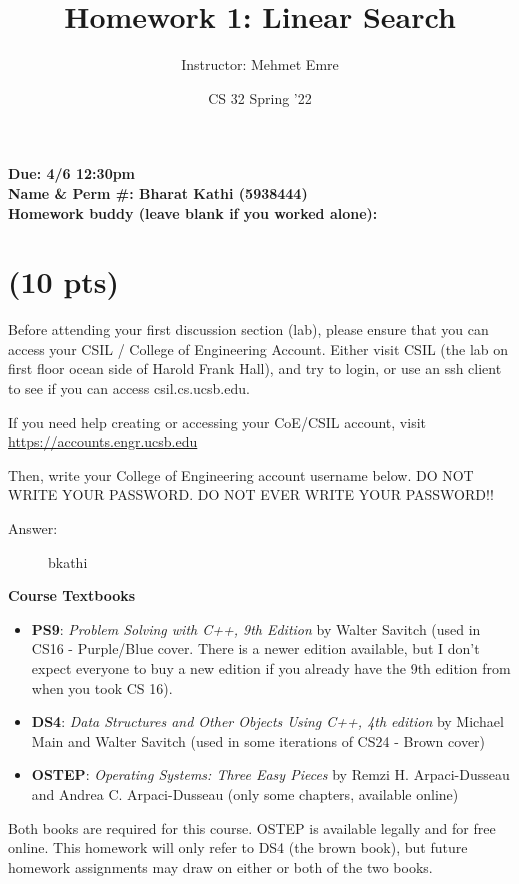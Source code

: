 \documentclass[11pt]{article}
\author{Instructor: Mehmet Emre}
\date{CS 32 Spring '22}
\title{Homework 1: Linear Search}
\begin{document}
\maketitle
\textbf{Due: 4/6 12:30pm} \\ 
\textbf{Name \& Perm \#: Bharat Kathi (5938444)} \\ 
\textbf{Homework buddy (leave blank if you worked alone):}

\section{(10 pts)}
\label{sec:org9fa09aa}

Before attending your first discussion section (lab), please ensure
that you can access your CSIL / College of Engineering
Account. Either visit CSIL (the lab on first floor ocean side of
Harold Frank Hall), and try to login, or use an ssh client to see if
you can access csil.cs.ucsb.edu.

If you need help creating or accessing your CoE/CSIL account, visit
\url{https://accounts.engr.ucsb.edu}

Then, write your College of Engineering account username below. DO NOT
WRITE YOUR PASSWORD. DO NOT EVER WRITE YOUR PASSWORD!!

\begin{description}
    \item[Answer:] bkathi
\end{description}

\vspace{4em}

\textbf{Course Textbooks}

\begin{itemize}
\item \textbf{PS9}: \emph{Problem Solving with C++, 9th Edition} by Walter Savitch (used in CS16 - Purple/Blue cover. There is a newer edition available, but I don't expect everyone to buy a new edition if you already have the 9th edition from when you took CS 16).
\item \textbf{DS4}: \emph{Data Structures and Other Objects Using C++, 4th edition} by Michael Main and Walter Savitch (used in some iterations of CS24 - Brown cover)
\item \textbf{OSTEP}: \emph{Operating Systems: Three Easy Pieces} by Remzi H. Arpaci-Dusseau and Andrea C. Arpaci-Dusseau (only some chapters, available online)
\end{itemize}

Both books are required for this course. OSTEP is available legally and for free online.
This homework will only refer to DS4 (the brown book), but future homework assignments may draw on either or both of the two books.
\end{document}
